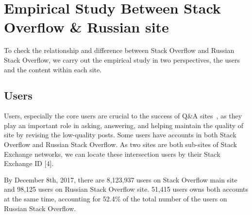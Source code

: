 \section{Empirical Study Between Stack Overflow \& Russian site}
To check the relationship and difference between Stack Overflow and Russian Stack Overflow, we carry out the empirical study in two perspectives, the users and the content within each site.

\subsection{Users}


Users, especially the core users are crucial to the success of Q\&A sites~\cite{mamykina2011design}, as they play an important role in asking, answering, and helping maintain the quality of site by revising the low-quality posts.
Some users have accounts in both Stack Overflow and Russian Stack Overflow.
As two sites are both sub-sites of Stack Exchange networks, we can locate these intersection users by their Stack Exchange ID [4].

By December 8th, 2017, there are 8,123,937 users on Stack Overflow main site and 98,125 users on Russian Stack Overflow site. 
51,415 users owns both accounts at the same time, accounting for 52.4\% of the total number of the users on Russian Stack Overflow.




